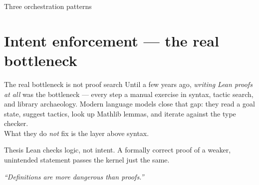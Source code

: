\documentclass[aspectratio=169,10pt]{beamer}
\begin{document}
\begin{frame}{Three orchestration patterns}
\begin{center}
    \end{center}
\end{frame}

\section{Intent enforcement --- the real bottleneck}

\begin{frame}{The real bottleneck is not proof search}
    Until a few years ago, \emph{writing Lean proofs at all} was the bottleneck --- every step a manual exercise in syntax, tactic search, and library archaeology. Modern language models close that gap: they read a goal state, suggest tactics, look up Mathlib lemmas, and iterate against the type checker.
    \vspace{0.6em}
    \\
    What they do \emph{not} fix is the layer above syntax.
    \vspace{0.4em}
    \begin{block}{Thesis}
        Lean checks logic, not intent. A formally correct proof of a weaker, unintended statement passes the kernel just the same.
    \end{block}
    \vspace{0.4em}
     \emph{``Definitions are more dangerous than proofs.''}
\end{frame}
\end{document}
